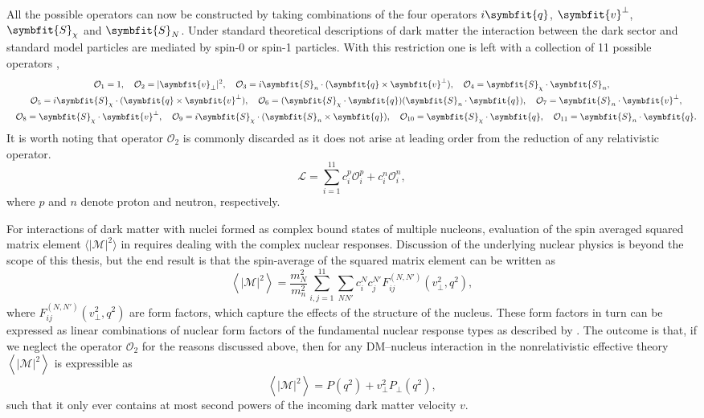 \documentclass[b5paper, 10pt, twoside]{book}
\renewcommand{\vec}[1]{\symbfit{#1}}
\newcommand{\mean}[1]{\left\langle#1\right\rangle}
\newcommand{\tmean}[1]{\langle#1\rangle}
\begin{document}
All the possible operators can now be constructed by taking combinations of the four operators $i\vec{q}$, $\vec{v}^\perp$, $\vec{S}_\chi$ and $\vec{S}_N$. Under standard theoretical descriptions of dark matter the interaction between the dark sector and standard model particles are mediated by spin-0 or spin-1 particles. With this restriction one is left with a collection of 11 possible operators \parencite{FitzpatrickEtAl2013},
\begin{gather*}
    \mathcal{O}_1=1,\quad\mathcal{O}_2=|\vec{v}_\perp|^2,\quad\mathcal{O}_3=i\vec{S}_n\cdot(\vec{q}\times\vec{v}^\perp),\quad\mathcal{O}_4=\vec{S}_\chi\cdot\vec{S}_n,\\
    \quad\mathcal{O}_5=i\vec{S}_\chi\cdot(\vec{q}\times\vec{v}^\perp),\quad\mathcal{O}_6=(\vec{S}_\chi\cdot\vec{q})(\vec{S}_n\cdot\vec{q}),\quad\mathcal{O}_7=\vec{S}_n\cdot\vec{v}^\perp,\\
    \quad\mathcal{O}_8=\vec{S}_\chi\cdot\vec{v}^\perp,\quad\mathcal{O}_9=i\vec{S}_\chi\cdot(\vec{S}_n\times\vec{q}),\quad\mathcal{O}_{10}=\vec{S}_\chi\cdot\vec{q},\quad\mathcal{O}_{11}=\vec{S}_n\cdot\vec{q}.
\end{gather*}
It is worth noting that operator $\mathcal{O}_2$ is commonly discarded as it does not arise at leading order from the reduction of any relativistic operator.
\begin{equation}
    \mathcal{L}=\sum_{i=1}^{11}c_i^p\mathcal{O}_i^p+c_i^n\mathcal{O}_i^n,
\end{equation}
where $p$ and $n$ denote proton and neutron, respectively.

For interactions of dark matter with nuclei formed as complex bound states of multiple nucleons, evaluation of the spin averaged squared matrix element $\tmean{|\mathcal{M}|^2}$ in requires dealing with the complex nuclear responses. Discussion of the underlying nuclear physics is beyond the scope of this thesis, but the end result is that the spin-average of the squared matrix element can be written as
\begin{equation}
    \mean{|\mathcal{M}|^2}=\frac{m_N^2}{m_n^2}\sum_{i,j=1}^{11}\sum_{NN'}c_i^Nc_j^{N'}F_{ij}^{(N,N')}(v_\perp^2,q^2),
\end{equation}
where $F_{ij}^{(N,N')}(v_\perp^2,q^2)$ are form factors, which capture the effects of the structure of the nucleus. These form factors in turn can be expressed as linear combinations of nuclear form factors of the fundamental nuclear response types as described by \textcite{FitzpatrickEtAl2013}. The outcome is that, if we neglect the operator $\mathcal{O}_2$ for the reasons discussed above, then for any DM--nucleus interaction in the nonrelativistic effective theory $\mean{|\mathcal{M}|^2}$ is expressible as
\begin{equation}
    \mean{|\mathcal{M}|^2}=P(q^2)+v_\perp^2P_\perp(q^2),
    \label{eq:eft-amplitude-square}
\end{equation}
such that it only ever contains at most second powers of the incoming dark matter velocity $v$.
\end{document}
